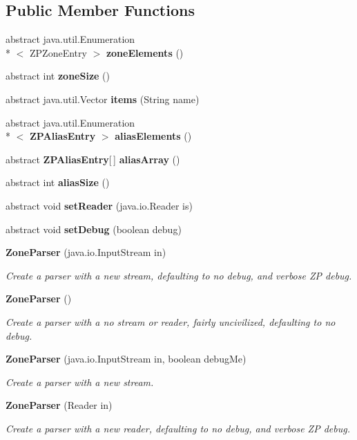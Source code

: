 \subsection*{Public Member Functions}
\begin{DoxyCompactItemize}
\item 
abstract java.\+util.\+Enumeration\\*
$<$ Z\+P\+Zone\+Entry $>$ {\bf zone\+Elements} ()
\item 
abstract int {\bf zone\+Size} ()
\item 
abstract java.\+util.\+Vector {\bf items} (String name)
\item 
abstract java.\+util.\+Enumeration\\*
$<$ {\bf Z\+P\+Alias\+Entry} $>$ {\bf alias\+Elements} ()
\item 
abstract {\bf Z\+P\+Alias\+Entry}[$\,$] {\bf alias\+Array} ()
\item 
abstract int {\bf alias\+Size} ()
\item 
abstract void {\bf set\+Reader} (java.\+io.\+Reader is)
\item 
abstract void {\bf set\+Debug} (boolean debug)
\item 
{\bf Zone\+Parser} (java.\+io.\+Input\+Stream in)
\begin{DoxyCompactList}\small\item\em Create a parser with a new stream, defaulting to no debug, and verbose Z\+P debug. \end{DoxyCompactList}\item 
{\bf Zone\+Parser} ()
\begin{DoxyCompactList}\small\item\em Create a parser with a no stream or reader, fairly uncivilized, defaulting to no debug. \end{DoxyCompactList}\item 
{\bf Zone\+Parser} (java.\+io.\+Input\+Stream in, boolean debug\+Me)
\begin{DoxyCompactList}\small\item\em Create a parser with a new stream. \end{DoxyCompactList}\item 
{\bf Zone\+Parser} (Reader in)
\begin{DoxyCompactList}\small\item\em Create a parser with a new reader, defaulting to no debug, and verbose Z\+P debug. \end{DoxyCompactList}\item 

\end{DoxyCompactItemize}
